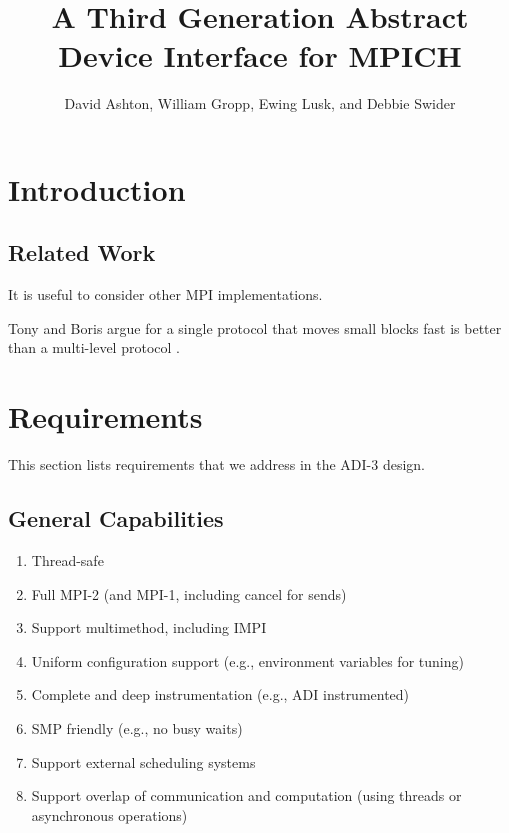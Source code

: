 \documentclass{article}
\begin{document}
\title{A Third Generation Abstract Device Interface for MPICH}
\author{David Ashton, William Gropp, Ewing Lusk, and Debbie Swider}
\maketitle

\pagestyle{plain}
{\parskip=0pt
\tableofcontents

\bigskip
}
\bigskip

\pagestyle{plain}
\clearpage

\setcounter{page}{1}


\section{Introduction}

\subsection{Related Work}
It is useful to consider other MPI implementations.

Tony and Boris argue for a single protocol that moves small blocks fast is
better than a multi-level protocol \cite{techreport}.

\section{Requirements}
This section lists requirements that we address in the ADI-3 design.

\subsection{General Capabilities}
\begin{enumerate}
\item Thread-safe
\item Full MPI-2 (and MPI-1, including cancel for sends)
\item Support multimethod, including IMPI
\item Uniform configuration support (e.g., environment variables for tuning)
\item Complete and deep instrumentation (e.g., ADI instrumented)
\item SMP friendly (e.g., no busy waits)
\item Support external scheduling systems
\item Support overlap of communication and computation (using threads or
  asynchronous operations)
\end{enumerate}
\end{document}

